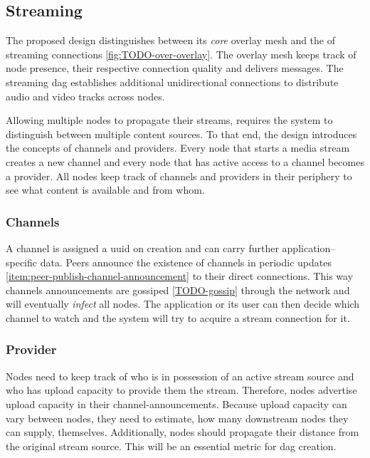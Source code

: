 \subsection{Streaming}

The proposed design distinguishes between its \textit{core} overlay mesh and the  of streaming connections \ref{fig:TODO-over-overlay}. The overlay mesh keeps track of node presence, their respective connection quality and delivers messages. The streaming \gls{dag} establishes additional unidirectional connections to distribute audio and video tracks across nodes.


Allowing multiple nodes to propagate their streams, requires the system to distinguish between multiple content sources. To that end, the design introduces the concepts of channels and providers. Every node that starts a media stream creates a new channel and every node that has active access to a channel becomes a provider. All nodes keep track of channels and providers in their periphery to see what content is available and from whom.

\subsubsection{Channels}
A channel is assigned a \gls{uuid} on creation and can carry further application–specific data. Peers announce the existence of channels in periodic updates \ref{item:peer-publish-channel-announcement} to their direct connections. This way channels announcements are gossiped \ref{TODO-gossip} through the network and will eventually \textit{infect} all nodes. The application or its user can then decide which channel to watch and the system will try to acquire a stream connection for it.

\subsubsection{Provider}
Nodes need to keep track of who is in possession of an active stream source and who has upload capacity to provide them the stream. Therefore, nodes advertise upload capacity in their \glspl{channel-announcement}. Because upload capacity can vary between nodes, they need to estimate, how many downstream nodes they can supply, themselves. Additionally, nodes should propagate their distance from the original stream source. This will be an essential metric for \gls{dag} creation.

